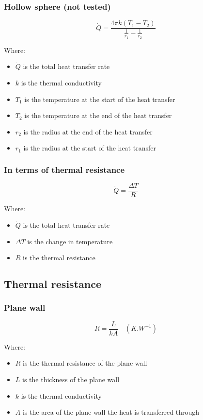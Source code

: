 \documentclass[11pt]{article}
\begin{document}
 \newpage
\subsubsection{Hollow sphere (not tested)}
\label{sec:org3f0df6e}
\[\dot{Q} = \frac{4 \pi k (T_1 - T_2)}{\frac{1}{r_1} - \frac{1}{r_2}}\]

Where:
\begin{itemize}
\item \(\dot{Q}\) is the total heat transfer rate
\item \(k\) is the thermal conductivity
\item \(T_1\) is the temperature at the start of the heat transfer
\item \(T_2\) is the temperature at the end of the heat transfer
\item \(r_2\) is the radius at the end of the heat transfer
\item \(r_1\) is the radius at the start of the heat transfer
\end{itemize}
\subsubsection{In terms of thermal resistance}
\label{sec:orgb153b1e}
\[\dot{Q} = \frac{\Delta T}{R}\]

Where:
\begin{itemize}
\item \(\dot{Q}\) is the total heat transfer rate
\item \(\Delta T\) is the change in temperature
\item \(R\) is the thermal resistance
\end{itemize}
\subsection{Thermal resistance}
\label{sec:org468c471}

\subsubsection{Plane wall}
\label{sec:orgbe7a366}
\[R = \frac{L}{kA} \quad (\unit{K.W^{-1}})\]

Where:
\begin{itemize}
\item \(R\) is the thermal resistance of the plane wall
\item \(L\) is the thickness of the plane wall
\item \(k\) is the thermal conductivity
\item \(A\) is the area of the plane wall the heat is transferred through
\end{itemize}
\end{document}
